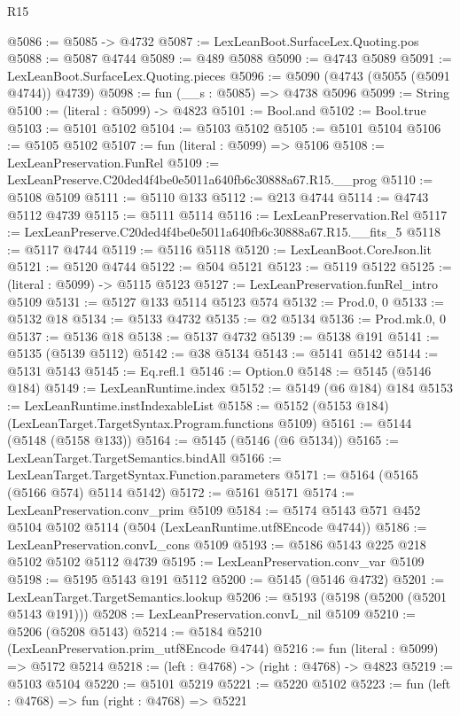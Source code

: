 \begin{lexlean}{R15}
\begin{coremodule}
{{{{{{{{{{{@5086 := @5085 -> @4732
@5087 := LexLeanBoot.SurfaceLex.Quoting.pos
@5088 := @5087 @4744
@5089 := @489 @5088
@5090 := @4743 @5089
@5091 := LexLeanBoot.SurfaceLex.Quoting.pieces
@5096 := @5090 (@4743 (@5055 (@5091 @4744)) @4739)
@5098 := fun (__s : @5085) => @4738 @5096
@5099 := String
@5100 := (literal : @5099) -> @4823
@5101 := Bool.and
@5102 := Bool.true
@5103 := @5101 @5102
@5104 := @5103 @5102
@5105 := @5101 @5104
@5106 := @5105 @5102
@5107 := fun (literal : @5099) => @5106
@5108 := LexLeanPreservation.FunRel
@5109 := LexLeanPreserve.C20ded4f4be0e5011a640fb6c30888a67.R15.__prog
@5110 := @5108 @5109
@5111 := @5110 @133
@5112 := @213 @4744
@5114 := @4743 @5112 @4739
@5115 := @5111 @5114
@5116 := LexLeanPreservation.Rel
@5117 := LexLeanPreserve.C20ded4f4be0e5011a640fb6c30888a67.R15.__fits_5
@5118 := @5117 @4744
@5119 := @5116 @5118
@5120 := LexLeanBoot.CoreJson.lit
@5121 := @5120 @4744
@5122 := @504 @5121
@5123 := @5119 @5122
@5125 := (literal : @5099) -> @5115 @5123
@5127 := LexLeanPreservation.funRel_intro @5109
@5131 := @5127 @133 @5114 @5123 @574
@5132 := Prod.{0, 0}
@5133 := @5132 @18
@5134 := @5133 @4732
@5135 := @2 @5134
@5136 := Prod.mk.{0, 0}
@5137 := @5136 @18
@5138 := @5137 @4732
@5139 := @5138 @191
@5141 := @5135 (@5139 @5112)
@5142 := @38 @5134
@5143 := @5141 @5142
@5144 := @5131 @5143
@5145 := Eq.refl.{1}
@5146 := Option.{0}
@5148 := @5145 (@5146 @184)
@5149 := LexLeanRuntime.index
@5152 := @5149 (@6 @184) @184
@5153 := LexLeanRuntime.instIndexableList
@5158 := @5152 (@5153 @184) (LexLeanTarget.TargetSyntax.Program.functions @5109)
@5161 := @5144 (@5148 (@5158 @133))
@5164 := @5145 (@5146 (@6 @5134))
@5165 := LexLeanTarget.TargetSemantics.bindAll
@5166 := LexLeanTarget.TargetSyntax.Function.parameters
@5171 := @5164 (@5165 (@5166 @574) @5114 @5142)
@5172 := @5161 @5171
@5174 := LexLeanPreservation.conv_prim @5109
@5184 := @5174 @5143 @571 @452 @5104 @5102 @5114 (@504 (LexLeanRuntime.utf8Encode @4744))
@5186 := LexLeanPreservation.convL_cons @5109
@5193 := @5186 @5143 @225 @218 @5102 @5102 @5112 @4739
@5195 := LexLeanPreservation.conv_var @5109
@5198 := @5195 @5143 @191 @5112
@5200 := @5145 (@5146 @4732)
@5201 := LexLeanTarget.TargetSemantics.lookup
@5206 := @5193 (@5198 (@5200 (@5201 @5143 @191)))
@5208 := LexLeanPreservation.convL_nil @5109
@5210 := @5206 (@5208 @5143)
@5214 := @5184 @5210 (LexLeanPreservation.prim_utf8Encode @4744)
@5216 := fun (literal : @5099) => @5172 @5214
@5218 := (left : @4768) -> (right : @4768) -> @4823
@5219 := @5103 @5104
@5220 := @5101 @5219
@5221 := @5220 @5102
@5223 := fun (left : @4768) => fun (right : @4768) => @5221
}}}}}}}}}}}
\end{coremodule}
\end{lexlean}
